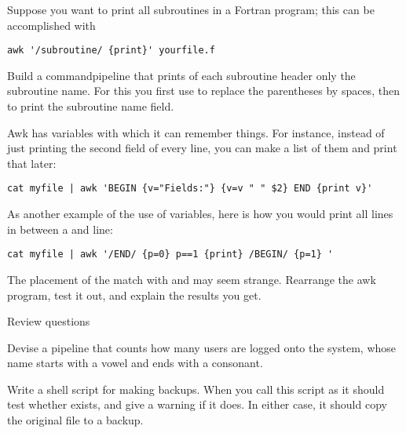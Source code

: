 Suppose you want to print all subroutines in a Fortran program; this
can be accomplished with
\begin{verbatim}
awk '/subroutine/ {print}' yourfile.f
\end{verbatim}

\begin{exercise}
  Build a commandpipeline that prints of each subroutine header only
  the subroutine name. For this you first use  to replace the
  parentheses by spaces, then  to print the subroutine name
  field.
\end{exercise}

Awk has variables with which it can remember things. For instance,
instead of just printing the second field of every line, you can make
a list of them and print that later:
\begin{verbatim}
cat myfile | awk 'BEGIN {v="Fields:"} {v=v " " $2} END {print v}'
\end{verbatim}

As another example of the use of variables, here is how you would
print all lines in between a  and  line:
\begin{verbatim}
cat myfile | awk '/END/ {p=0} p==1 {print} /BEGIN/ {p=1} '
\end{verbatim}

\begin{exercise}
  The placement of the match with  and  may seem
  strange. Rearrange the awk program, test it out, and explain the
  results you get.
\end{exercise}

 {Review questions}

\begin{istc}
\begin{exercise}
    Devise a pipeline that counts how many users are logged onto
    the system, whose name starts with a vowel and ends with a
    consonant.
\end{exercise}
\end{istc}

\begin{exercise}
Write a shell script for making backups. When you call this script as
 it should test whether  exists,
and give a warning if it does. In either case, it should copy the 
original file to a backup.
\end{exercise}



